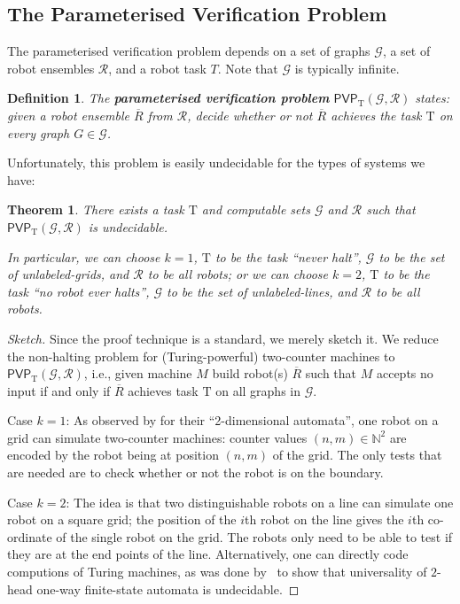 \documentclass{aamas2015}
\newtheorem{dfn}{Definition}
\newtheorem{thm}{Theorem}
\def\gclass{\mathcal{G}}
\def\rclass{\mathcal{R}}
\def\T{\mathrm{T}}
\def\nat{\mathbb{N}}
\def\PVP{\mathsf{PVP}}
\newcommand{\tup}[1]{\overline{#1}}
\newcommand{\sr}[1]{\footnote{{\color{red} Note. #1}}}
\begin{document}
\subsection{The Parameterised Verification Problem}

The parameterised verification problem depends on a set of graphs $\gclass$, a set of robot ensembles $\rclass$, and a robot task $T$.  Note that $\gclass$ is typically infinite.

\begin{dfn}
The \textbf{parameterised verification problem} $\PVP_\T(\gclass,\rclass)$ states: given a robot ensemble $\tup{R}$ from $\rclass$, decide whether or not $\tup{R}$ achieves the task $\T$ on every graph $G \in \gclass$. 
\end{dfn}

Unfortunately, this problem is easily undecidable for the types of systems we have:
\begin{thm} \label{thm:undec}
There exists a task $\T$ and computable sets $\gclass$ and $\rclass$ such that $\PVP_\T(\gclass,\rclass)$ is undecidable. 

In particular, we can choose $k=1$, $\T$ to be the task ``never halt'', $\gclass$ to be the set of unlabeled-grids, and $\rclass$ to be all robots; or we can choose $k=2$, $\T$ to be the task ``no robot ever halts'', $\gclass$ to be the set of unlabeled-lines, and $\rclass$ to be all robots. 
\end{thm}

\begin{proof}[Sketch]
Since the proof technique is a standard, we merely sketch it.  
We reduce the non-halting problem for (Turing-powerful) two-counter machines to $\PVP_\T(\gclass,\rclass)$, i.e., given machine $M$ build robot(s) $\tup{R}$ such that $M$ accepts no input if and only if $\tup{R}$ achieves task $\T$ on all graphs in $\gclass$.

Case $k=1$: As observed by \cite{BlHe67} for their ``2-dimensional automata'', one robot on a grid can simulate two-counter machines: counter values $(n,m) \in \nat^2$ are encoded by the robot being at position $(n,m)$ of the grid. The only tests that are needed are to check whether or not the robot is on the boundary. 

Case $k=2$: The idea is that two distinguishable robots on a line can simulate one robot on a square grid; the position of the $i$th robot on the line gives the $i$th co-ordinate of the single robot on the grid. The robots only need to be able to test if they are at the end points of the line. Alternatively, one can directly code computions of Turing machines, as was done by~\cite{Ro66} to show that universality of $2$-head one-way finite-state automata is undecidable.
\end{proof}
\end{document}
